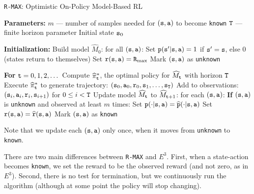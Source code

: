 \begin{algorithm}[H]
\caption{\texttt{R-MAX}: Optimistic On-Policy Model-Based RL}
\begin{algorithmic}[1]
\State \textbf{Parameters:}
\State \quad $m$ — number of samples needed for $({\tt s}, {\tt a})$ to become \texttt{known}
\State \quad ${\tt T}$ — finite horizon parameter
\State \quad Initial state ${\tt s}_0$

\vspace{1ex}
\State \textbf{Initialization:}
\State \quad Build model $\widehat{M}_0$: for all $({\tt s}, {\tt a})$:
\State \quad \quad Set ${\tt p}({\tt s}'|{\tt s},{\tt a}) = 1$ if ${\tt s}' = {\tt s}$, else $0$ \quad (states return to themselves)
\State \quad \quad Set ${\tt r}({\tt s}, {\tt a}) = {\tt R}_{\max }$
\State \quad \quad Mark $({\tt s}, {\tt a})$ as \texttt{unknown}

\vspace{1ex}
\State \textbf{For} ${\tt t} = 0, 1, 2, \dots$
\State \quad Compute $\widehat{\pi}^*_{\tt t}$, the optimal policy for $\widehat{M}_{\tt t}$ with horizon ${\tt T}$
\State \quad Execute $\widehat{\pi}^*_{\tt t}$ to generate trajectory: $({\tt s}_0, {\tt a}_0, {\tt r}_0, {\tt s}_1, \ldots, {\tt s}_{\tt T})$
\State \quad Add to observations: $({\tt s}_i, {\tt a}_i, {\tt r}_i, {\tt s}_{i+1})$ for $0 \leq i < {\tt T}$
\State \quad Update model $\widehat{M}_{\tt t}$ to $\widehat{M}_{{\tt t}+1}$: for each $({\tt s}, {\tt a})$:
\State \quad \quad \textbf{If} $({\tt s}, {\tt a})$ is \texttt{unknown} and observed at least $m$ times:
\State \quad \quad \quad Set ${\tt p}(\cdot|{\tt s}, {\tt a}) = \widehat{{\tt p}}(\cdot|{\tt s}, {\tt a})$
\State \quad \quad \quad Set ${\tt r}({\tt s}, {\tt a}) = \widehat{{\tt r}}({\tt s}, {\tt a})$
\State \quad \quad \quad Mark $({\tt s}, {\tt a})$ as \texttt{known}
\end{algorithmic}
\end{algorithm}

Note that we update each $({\tt s},{\tt a})$ only once, when it moves from \texttt{unknown} to \texttt{known}.

There are two main differences between {\tt R-MAX} and $E^3$. First, when a
state-action becomes \texttt{known}, we set the reward to be the observed
reward (and not zero, as in $E^3$). Second, there is no test for
termination, but we continuously run the algorithm (although at
some point the policy will stop changing).

